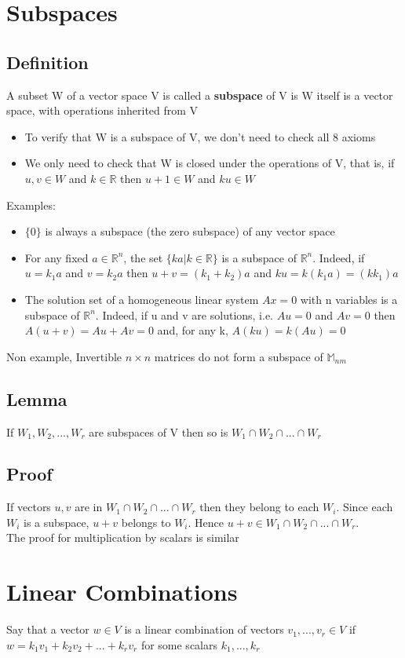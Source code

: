 \documentclass{article}[18pt]
\begin{document}
\section{Subspaces}
\subsection{Definition}
A subset W of a vector space V is called a \textbf{subspace} of V is W itself is a vector space, with operations inherited from V
\begin{itemize}
	\item To verify that W is a subspace of V, we don't need to check all 8 axioms
	\item We only need to check that W is closed under the operations of V, that is, if $u,v\in W$ and $k\in \mathbb{ R }$ then $u+1\in W$ and $ku\in W$
\end{itemize}
Examples:
\begin{itemize}
	\item $\{0\}$ is always a subspace (the zero subspace) of any vector space
	\item For any fixed $a\in \mathbb{ R }^n$, the set $\{ka|k\in \mathbb{ R }\}$ is a subspace of $\mathbb{ R }^n$. Indeed, if $u=k_1a$ and $v=k_2a$ then $u+v=(k_1+k_2)a$ and $ku=k(k_1a)=(kk_1)a$
	\item The solution set of a homogeneous linear system $Ax=0$ with n variables is a subspace of $\mathbb{ R }^n$. Indeed, if u and v are solutions, i.e. $Au=0$ and $Av=0$ then $A(u+v)=Au+Av=0$ and, for any k, $A(ku)=k(Au)=0$ 
\end{itemize}
Non example, Invertible $n\times n$ matrices do not form a subspace of $\mathbb{M}_{nm}$
\subsection{Lemma}
If $W_1,W_2,...,W_r$ are subspaces of V then so is $W_1\cap W_2 \cap ... \cap W_r$
\subsection{Proof}
If vectors $u,v$ are in $W_1\cap W_2 \cap ... \cap W_r$ then they belong to each $W_i$. Since each $W_i$ is a subspace, $u+v$ belongs to $W_i$. Hence $u+v\in W_1\cap W_2 \cap ... \cap W_r$.\\
The proof for multiplication by scalars is similar
\section{Linear Combinations}
Say that a vector $w\in V$ is a linear combination of vectors $v_1,...,v_r\in V$ if $w=k_1v_1+k_2v_2+...+k_rv_r$ for some scalars $k_1,...,k_r$
\end{document}
